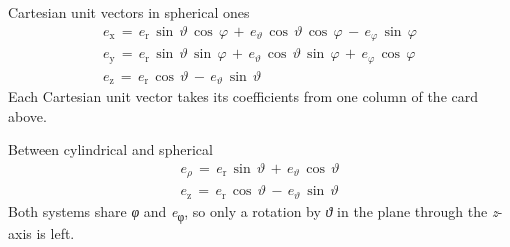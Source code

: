 \documentclass[11pt]{article}
\begin{document}
\begin{keepsection}
\begin{equationcard}{Cartesian unit vectors in spherical ones}
\[ \begin{gathered} {e}_{\mathrm{x}}\, =\, {e}_{\mathrm{r}}\, \sin \, {ϑ}\, \cos \, {φ}\, +\, {e}_{ϑ}\, \cos \, {ϑ}\, \cos \, {φ}\, -\, {e}_{φ}\, \sin \, {φ} \\ {e}_{\mathrm{y}}\, =\, {e}_{\mathrm{r}}\, \sin \, {ϑ}\, \sin \, {φ}\, +\, {e}_{ϑ}\, \cos \, {ϑ}\, \sin \, {φ}\, +\, {e}_{φ}\, \cos \, {φ} \\ {e}_{\mathrm{z}}\, =\, {e}_{\mathrm{r}}\, \cos \, {ϑ}\, -\, {e}_{ϑ}\, \sin \, {ϑ} \end{gathered} \]
{\small Each Cartesian unit vector takes its coefficients from one column of the card above.}
\end{equationcard}

\begin{equationcard}{Between cylindrical and spherical}
\[ \begin{gathered} {e}_{ρ}\, =\, {e}_{\mathrm{r}}\, \sin \, {ϑ}\, +\, {e}_{ϑ}\, \cos \, {ϑ} \\ {e}_{\mathrm{z}}\, =\, {e}_{\mathrm{r}}\, \cos \, {ϑ}\, -\, {e}_{ϑ}\, \sin \, {ϑ} \end{gathered} \]
{\small Both systems share \textit{φ} and \textit{e}\textsubscript{φ}, so only a rotation by \textit{ϑ} in the plane through the \textit{z}-axis is left.}
\end{equationcard}
\end{keepsection}
\end{document}
